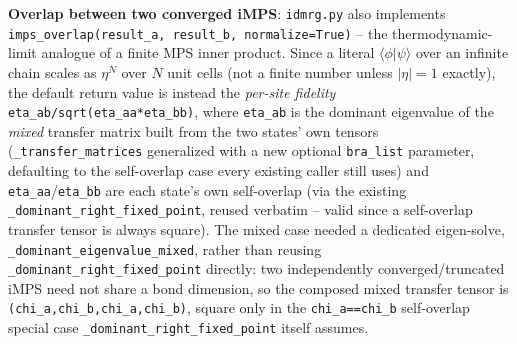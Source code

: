 \documentclass[11pt]{article}
\begin{document}
\textbf{Overlap between two converged iMPS}: \texttt{idmrg.py} also
implements \texttt{imps\_overlap(result\_a, result\_b, normalize=True)}
-- the thermodynamic-limit analogue of a finite MPS inner product. Since
a literal $\langle\phi|\psi\rangle$ over an infinite chain scales as
$\eta^N$ over $N$ unit cells (not a finite number unless $|\eta|=1$
exactly), the default return value is instead the \emph{per-site
fidelity} \texttt{eta\_ab/sqrt(eta\_aa*eta\_bb)}, where \texttt{eta\_ab}
is the dominant eigenvalue of the \emph{mixed} transfer matrix built
from the two states' own tensors (\texttt{\_transfer\_matrices}
generalized with a new optional \texttt{bra\_list} parameter, defaulting
to the self-overlap case every existing caller still uses) and
\texttt{eta\_aa}/\texttt{eta\_bb} are each state's own self-overlap (via
the existing \texttt{\_dominant\_right\_fixed\_point}, reused verbatim
-- valid since a self-overlap transfer tensor is always square). The
mixed case needed a dedicated eigen-solve,
\texttt{\_dominant\_eigenvalue\_mixed}, rather than reusing
\texttt{\_dominant\_right\_fixed\_point} directly: two independently
converged/truncated iMPS need not share a bond dimension, so the
composed mixed transfer tensor is
\texttt{(chi\_a,chi\_b,chi\_a,chi\_b)}, square only in the
\texttt{chi\_a==chi\_b} self-overlap special case
\texttt{\_dominant\_right\_fixed\_point} itself assumes.
\end{document}
